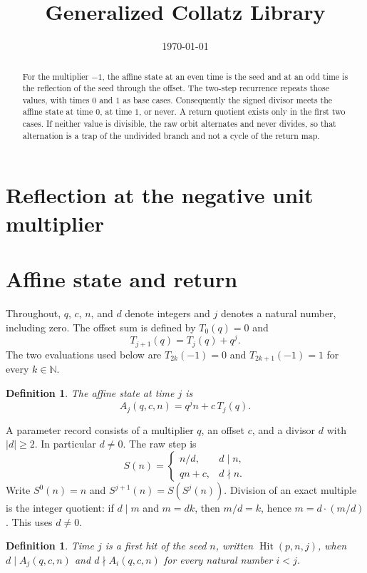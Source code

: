\documentclass[11pt,letterpaper]{article}
\title{Generalized Collatz Library}
\author{}
\date{\today}
\newcommand{\N}{\mathbb{N}}
\newtheorem{definition}[theorem]{Definition}
\begin{document}
\maketitle
\section*{Reflection at the negative unit multiplier}

\begin{abstract}
For the multiplier \(-1\), the affine state at an even time is the seed and at
an odd time is the reflection of the seed through the offset. The two-step
recurrence repeats those values, with times \(0\) and \(1\) as base cases.
Consequently the signed divisor meets the affine state at time \(0\), at time
\(1\), or never. A return quotient exists only in the first two cases. If
neither value is divisible, the raw orbit alternates and never divides, so
that alternation is a trap of the undivided branch and not a cycle of the
return map.
\end{abstract}

\section{Affine state and return}

Throughout, \(q\), \(c\), \(n\), and \(d\) denote integers and \(j\) denotes a
natural number, including zero. The offset sum is defined by \(T_0(q)=0\) and
\[
T_{j+1}(q)=T_j(q)+q^j.
\]
The two evaluations used below are \(T_{2k}(-1)=0\) and \(T_{2k+1}(-1)=1\)
for every \(k\in\N\).

\begin{definition}
\label{def:affine-state}
The affine state at time \(j\) is
\[
A_j(q,c,n)=q^j n+c\,T_j(q).
\]
\end{definition}

A parameter record consists of a multiplier \(q\), an offset \(c\), and a
divisor \(d\) with \(|d|\ge 2\). In particular \(d\neq 0\). The raw step is
\[
S(n)=\begin{cases}
n/d, & d\mid n,\\
qn+c, & d\nmid n.
\end{cases}
\]
Write \(S^{0}(n)=n\) and \(S^{j+1}(n)=S(S^{j}(n))\). Division of an exact
multiple is the integer quotient: if \(d\mid m\) and \(m=dk\), then
\(m/d=k\), hence \(m=d\cdot(m/d)\). This uses \(d\neq 0\).

\begin{definition}
\label{def:first-hit}
Time \(j\) is a first hit of the seed \(n\), written
\(\operatorname{Hit}(p,n,j)\), when \(d\mid A_j(q,c,n)\) and
\(d\nmid A_i(q,c,n)\) for every natural number \(i<j\).
\end{definition}
\end{document}
